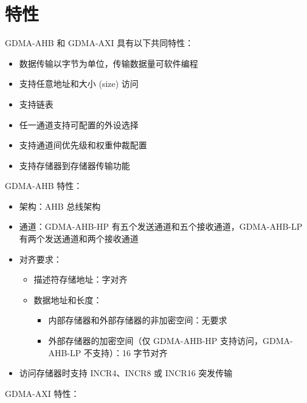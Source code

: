 \documentclass[main\_\_CN.tex]{subfiles}
\begin{document}
\section{特性}

GDMA-AHB 和 GDMA-AXI 具有以下共同特性：

\begin{itemize}
    \item 数据传输以字节为单位，传输数据量可软件编程
    \item 支持任意地址和大小 (size) 访问
    \item 支持链表
    \item 任一通道支持可配置的外设选择
    \item 支持通道间优先级和权重仲裁配置
    \item 支持存储器到存储器传输功能
\end{itemize}

GDMA-AHB 特性：

\begin{itemize}
    \item 架构：AHB 总线架构
    \item 通道：GDMA-AHB-HP 有五个发送通道和五个接收通道，GDMA-AHB-LP 有两个发送通道和两个接收通道
    \item 对齐要求：
        \begin{itemize}
            \item 描述符存储地址：字对齐
            \item 数据地址和长度：
                \begin{itemize}
                    \item 内部存储器和外部存储器的非加密空间：无要求
                    \item 外部存储器的加密空间（仅 GDMA-AHB-HP 支持访问，GDMA-AHB-LP 不支持）：16 字节对齐
                \end{itemize}
        \end{itemize}
    \item 访问存储器时支持 INCR4、INCR8 或 INCR16 突发传输
\end{itemize}

GDMA-AXI 特性：
\end{document}
